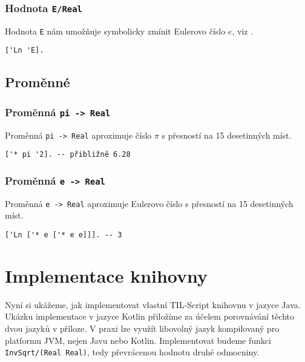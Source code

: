 \subsubsection*{Hodnota \lstinline{E/Real}}

Hodnota \lstinline{E} nám umožňuje symbolicky zmínit Eulerovo číslo $e$,
viz .

\begin{lstlisting}[caption={Ukázka využití E}]
['Ln 'E].
\end{lstlisting}

\subsection{Proměnné}

\subsubsection*{Proměnná \lstinline{pi -> Real}}

Proměnná \lstinline{pi -> Real} aproximuje číslo $\pi$ s přesností na 15 desetinných míst.

\begin{lstlisting}[caption={Ukázka využití proměnné pi}]
['* pi '2]. -- přibližně 6.28
\end{lstlisting}

\subsubsection*{Proměnná \lstinline{e -> Real}}

Proměnná \lstinline{e -> Real} aproximuje Eulerovo číslo s přesností na 15 desetinných míst.

\begin{lstlisting}[caption={Ukázka využití proměnné e}]
['Ln ['* e ['* e e]]]. -- 3
\end{lstlisting}

\section{Implementace knihovny}

Nyní si ukážeme, jak implementovat vlastní TIL-Script knihovnu v jazyce Java. Ukázku implementace
v jazyce Kotlin přiložíme za účelem porovnávání těchto dvou jazyků v příloze. V praxi lze využít
libovolný jazyk kompilovaný pro platformu JVM, nejen Javu nebo Kotlin. Implementovat budeme funkci
\lstinline{InvSqrt/(Real Real)}, tedy převrácenou hodnotu druhé odmocniny.

